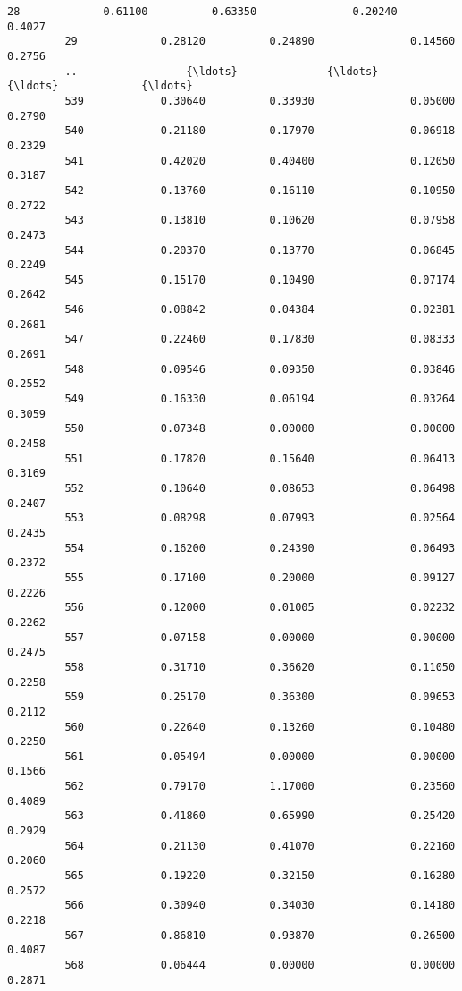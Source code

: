 \documentclass[11pt]{article}
\begin{document}
\begin{Verbatim}[commandchars=\\\{\}]
         28             0.61100          0.63350               0.20240          0.4027   
         29             0.28120          0.24890               0.14560          0.2756   
         ..                 {\ldots}              {\ldots}                   {\ldots}             {\ldots}   
         539            0.30640          0.33930               0.05000          0.2790   
         540            0.21180          0.17970               0.06918          0.2329   
         541            0.42020          0.40400               0.12050          0.3187   
         542            0.13760          0.16110               0.10950          0.2722   
         543            0.13810          0.10620               0.07958          0.2473   
         544            0.20370          0.13770               0.06845          0.2249   
         545            0.15170          0.10490               0.07174          0.2642   
         546            0.08842          0.04384               0.02381          0.2681   
         547            0.22460          0.17830               0.08333          0.2691   
         548            0.09546          0.09350               0.03846          0.2552   
         549            0.16330          0.06194               0.03264          0.3059   
         550            0.07348          0.00000               0.00000          0.2458   
         551            0.17820          0.15640               0.06413          0.3169   
         552            0.10640          0.08653               0.06498          0.2407   
         553            0.08298          0.07993               0.02564          0.2435   
         554            0.16200          0.24390               0.06493          0.2372   
         555            0.17100          0.20000               0.09127          0.2226   
         556            0.12000          0.01005               0.02232          0.2262   
         557            0.07158          0.00000               0.00000          0.2475   
         558            0.31710          0.36620               0.11050          0.2258   
         559            0.25170          0.36300               0.09653          0.2112   
         560            0.22640          0.13260               0.10480          0.2250   
         561            0.05494          0.00000               0.00000          0.1566   
         562            0.79170          1.17000               0.23560          0.4089   
         563            0.41860          0.65990               0.25420          0.2929   
         564            0.21130          0.41070               0.22160          0.2060   
         565            0.19220          0.32150               0.16280          0.2572   
         566            0.30940          0.34030               0.14180          0.2218   
         567            0.86810          0.93870               0.26500          0.4087   
         568            0.06444          0.00000               0.00000          0.2871   
         

\end{Verbatim}
\end{document}
